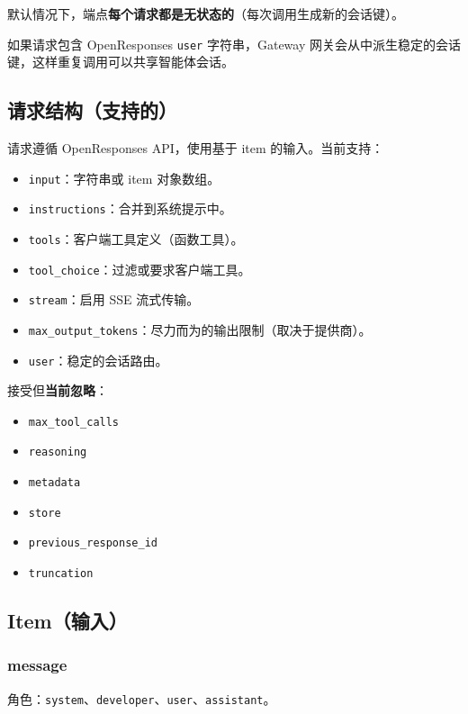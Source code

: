 默认情况下，端点\textbf{每个请求都是无状态的}（每次调用生成新的会话键）。

如果请求包含 OpenResponses \texttt{user} 字符串，Gateway 网关会从中派生稳定的会话键，这样重复调用可以共享智能体会话。

\subsection{请求结构（支持的）}


请求遵循 OpenResponses API，使用基于 item 的输入。当前支持：

\begin{itemize}
  \item \texttt{input}：字符串或 item 对象数组。
  \item \texttt{instructions}：合并到系统提示中。
  \item \texttt{tools}：客户端工具定义（函数工具）。
  \item \texttt{tool\_choice}：过滤或要求客户端工具。
  \item \texttt{stream}：启用 SSE 流式传输。
  \item \texttt{max\_output\_tokens}：尽力而为的输出限制（取决于提供商）。
  \item \texttt{user}：稳定的会话路由。
\end{itemize}


接受但\textbf{当前忽略}：

\begin{itemize}
  \item \texttt{max\_tool\_calls}
  \item \texttt{reasoning}
  \item \texttt{metadata}
  \item \texttt{store}
  \item \texttt{previous\_response\_id}
  \item \texttt{truncation}
\end{itemize}


\subsection{Item（输入）}


\subsubsection{message}


角色：\texttt{system}、\texttt{developer}、\texttt{user}、\texttt{assistant}。

